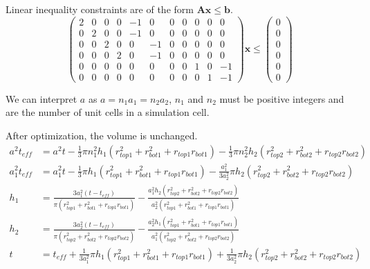 \documentclass[12pt]{article}
\numberwithin{equation}{section}
\numberwithin{equation}{section}
\begin{document}
\begin{outline}[enumerate]
Linear inequality constraints are of the form $\mathbf{A} \mathbf{x} \leq \mathbf{b}$.
\setcounter{MaxMatrixCols}{20}
\begin{equation}
\left(
\begin{matrix}
2 & 0 & 0 & 0 & -1 & 0 & 0 & 0 & 0 & 0 & 0 \\
0 & 2 & 0 & 0 & -1 & 0 & 0 & 0 & 0 & 0 & 0\\
0 & 0 & 2 & 0 & 0 & -1 & 0 & 0 & 0 & 0 & 0\\
0 & 0 & 0 & 2 & 0 & -1 & 0 & 0 & 0 & 0 & 0 \\
0 & 0 & 0 & 0 & 0 & 0 & 0 & 0 & 1 & 0 & -1 \\
0 & 0 & 0 & 0 & 0 & 0 & 0 & 0 & 0 & 1 & -1 
\end{matrix}
\right ) \mathbf{x}  \leq \left ( \begin{matrix} 0\\ 0\\ 0\\ 0 \\0 \\ 0 \end{matrix} \right ) 
\end{equation}

We can interpret $a$ as $a = n_1 a_1 = n_2 a_2$, $n_1$ and $n_2$ must be positive integers and are the number of unit cells in a simulation cell.  

After optimization, the volume is unchanged. 
\begin{align*}
a^2t_{eff} &=a^2t - \frac{1}{3}\pi n_1^2h_1(r_{top1}^2+r_{bot1}^2+r_{top1}r_{bot1})- \frac{1}{3}\pi n_2^2 h_2(r_{top2}^2+r_{bot2}^2+r_{top2}r_{bot2})\nonumber \\
a_1^2t_{eff} &=a_1^2t - \frac{1}{3}\pi h_1(r_{top1}^2+r_{bot1}^2+r_{top1}r_{bot1})- \frac{a_1^2}{3a_2^2}\pi h_2(r_{top2}^2+r_{bot2}^2+r_{top2}r_{bot2})\nonumber \\
h_1&= \frac{3a_1^2(t-t_{eff})}{\pi (r_{top1}^2+r_{bot1}^2+r_{top1}r_{bot1})} - \frac{a_1^2  h_2(r_{top2}^2+r_{bot2}^2+r_{top2}r_{bot2})}{a_2^2 (r_{top1}^2+r_{bot1}^2+r_{top1}r_{bot1})} \nonumber \\
h_2&= \frac{3a_2^2(t-t_{eff})}{\pi (r_{top2}^2+r_{bot2}^2+r_{top2}r_{bot2})} - \frac{a_2^2  h_1(r_{top1}^2+r_{bot1}^2+r_{top1}r_{bot1})}{a_1^2 (r_{top2}^2+r_{bot2}^2+r_{top2}r_{bot2})} \nonumber \\
t &= t_{eff} + \frac{1}{3a_1^2}\pi h_1(r_{top1}^2+r_{bot1}^2+r_{top1}r_{bot1})+ \frac{1}{3a_2^2} \pi h_2(r_{top2}^2+r_{bot2}^2+r_{top2}r_{bot2})
\end {align*}


\end{outline}
\end{document}
